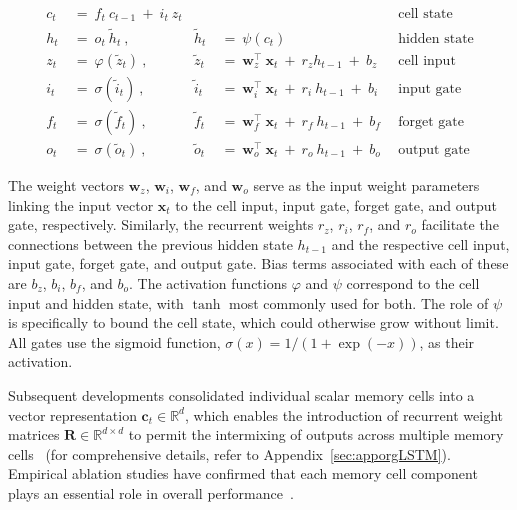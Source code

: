\begin{align}
c_t \ &= \  f_t \ c_{t-1} \ + \ i_t \ z_t &  & &\text{cell state} \\
h_t  \ &= \ o_t \ \tilde{h}_t \ , & \tilde{h}_t \ &= \ \psi \left( c_t\right)
  &\text{hidden state} \\
z_t \ &= \ \varphi \left( \tilde{z}_t \right) \ , 
  &\tilde{z}_t \ &=  \ \mathbf{w}^\top_{z} \ \mathbf{x}_t \ + \
  r_{z}  h_{t-1} \ + \  b_{z} \ \
  &\text{cell input} \\
i_t \ &= \ \sigma \left( \tilde{i}_t  \right) \ , 
  &\tilde{i}_t \ &= \ \mathbf{w}^\top_{i} \ \mathbf{x}_t \ + \
  r_{i}  \ h_{t-1} \ + \  b_{i} \ \
  &\text{input gate} \\
f_t \ &= \ \sigma \left(  \tilde{f}_t \right) \ , 
  &\tilde{f}_t \ &= \ \mathbf{w}^\top_{f} \ \mathbf{x}_t  \ + \
  r_{f}  \ h_{t-1} \ + \  b_{f} \ \
  &\text{forget gate} \\
o_t \ &= \ \sigma \left( \tilde{o}_t \right) \ , 
  &\tilde{o}_t  \ &= \ \mathbf{w}^\top_{o} \ \mathbf{x}_t \ + \
  r_{o}  \ h_{t-1} \ + \  b_{o} \ \
  &\text{output gate} 
\end{align}

The weight vectors $\mathbf{w}_{z}$, $\mathbf{w}_{i}$, $\mathbf{w}_{f}$, and $\mathbf{w}_{o}$ serve as the input weight parameters linking the input vector $\mathbf{x}_t$ to the cell input, input gate, forget gate, and output gate, respectively. Similarly, the recurrent weights $r_{z}$, $r_{i}$, $r_{f}$, and $r_{o}$ facilitate the connections between the previous hidden state $h_{t-1}$ and the respective cell input, input gate, forget gate, and output gate. Bias terms associated with each of these are $b_{z}$, $b_{i}$, $b_{f}$, and $b_{o}$. The activation functions $\varphi$ and $\psi$ correspond to the cell input and hidden state, with $\tanh$ most commonly used for both. The role of $\psi$ is specifically to bound the cell state, which could otherwise grow without limit. All gates use the sigmoid function, $\sigma \left( x \right)= 1/(1+\exp(-x))$, as their activation. 

Subsequent developments consolidated individual scalar memory cells into a vector representation $\mathbf{c}_t \in \mathbb{R}^{d}$, which enables the introduction of recurrent weight matrices $\mathbf{R} \in \mathbb{R}^{d \times d}$ to permit the intermixing of outputs across multiple memory cells~\citep{Greff:15} (for comprehensive details, refer to Appendix~\ref{sec:apporgLSTM}). Empirical ablation studies have confirmed that each memory cell component plays an essential role in overall performance~\citep{Greff:15}.

